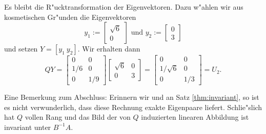 Es bleibt die R"ucktransformation der Eigenvektoren. Dazu w"ahlen wir aus kosmetischen Gr"unden die Eigenvektoren
\[
y_1 := \begin{bmatrix}
\sqrt6 \\ 0
\end{bmatrix}
\text{ und }
y_2 := \begin{bmatrix}
0 \\ 3
\end{bmatrix}
\]
und setzen $Y = [y_1 \ y_2]$. Wir erhalten dann
\[
QY = \begin{bmatrix} 0 & 0 \\ 1/6 & 0 \\ 0 & 1/9 \end{bmatrix}
\begin{bmatrix}
\sqrt6 & 0 \\ 0 & 3
\end{bmatrix}
=
\begin{bmatrix} 0 & 0  \\ 1/\sqrt6 & 0  \\ 0 & 1/3  \end{bmatrix}
= U_2.
\]

Eine Bemerkung zum Abschluss: Erinnern wir und an Satz \ref{thm:invariant}, so ist es nicht verwunderlich, dass diese Rechnung
exakte Eigenpaare liefert. Schlie"slich hat $Q$
vollen Rang und das Bild der von $Q$ induzierten linearen Abbildung ist invariant unter $B^{-1}A$.




